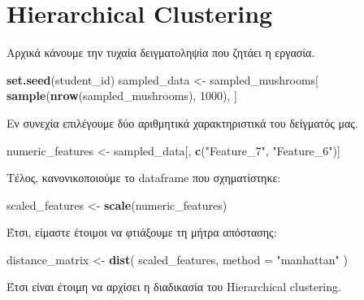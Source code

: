 \documentclass[
]{article}
\newenvironment{Shaded}{\begin{snugshade}}{\end{snugshade}}
\newcommand{\AttributeTok}[1]{\textcolor[rgb]{0.13,0.29,0.53}{#1}}
\newcommand{\DecValTok}[1]{\textcolor[rgb]{0.00,0.00,0.81}{#1}}
\newcommand{\FunctionTok}[1]{\textcolor[rgb]{0.13,0.29,0.53}{\textbf{#1}}}
\newcommand{\NormalTok}[1]{#1}
\newcommand{\OtherTok}[1]{\textcolor[rgb]{0.56,0.35,0.01}{#1}}
\newcommand{\StringTok}[1]{\textcolor[rgb]{0.31,0.60,0.02}{#1}}
\begin{document}
\section{Hierarchical Clustering}\label{hierarchical-clustering}

Αρχικά κάνουμε την τυχαία δειγματοληψία που ζητάει η εργασία.

\begin{Shaded}
\begin{Highlighting}[]
\FunctionTok{set.seed}\NormalTok{(student\_id)  }
\NormalTok{sampled\_data }\OtherTok{\textless{}{-}}\NormalTok{ sampled\_mushrooms[}
  \FunctionTok{sample}\NormalTok{(}\FunctionTok{nrow}\NormalTok{(sampled\_mushrooms), }\DecValTok{1000}\NormalTok{),}
\NormalTok{]}
\end{Highlighting}
\end{Shaded}

Εν συνεχία επιλέγουμε δύο αριθμητικά χαρακτηριστικά του δείγματός μας.

\begin{Shaded}
\begin{Highlighting}[]
\NormalTok{numeric\_features }\OtherTok{\textless{}{-}}\NormalTok{ sampled\_data[, }\FunctionTok{c}\NormalTok{(}\StringTok{"Feature\_7"}\NormalTok{, }\StringTok{"Feature\_6"}\NormalTok{)]}
\end{Highlighting}
\end{Shaded}

Τέλος, κανονικοποιούμε το dataframe που σχηματίστηκε:

\begin{Shaded}
\begin{Highlighting}[]
\NormalTok{scaled\_features }\OtherTok{\textless{}{-}} \FunctionTok{scale}\NormalTok{(numeric\_features)}
\end{Highlighting}
\end{Shaded}

Έτσι, είμαστε έτοιμοι να φτιάξουμε τη μήτρα απόστασης:

\begin{Shaded}
\begin{Highlighting}[]
\NormalTok{distance\_matrix }\OtherTok{\textless{}{-}} \FunctionTok{dist}\NormalTok{(}
\NormalTok{  scaled\_features,}
  \AttributeTok{method =} \StringTok{"manhattan"}
\NormalTok{)}
\end{Highlighting}
\end{Shaded}

Έτσι είναι έτοιμη να αρχίσει η διαδικασία του Hierarchical clustering.
\end{document}
